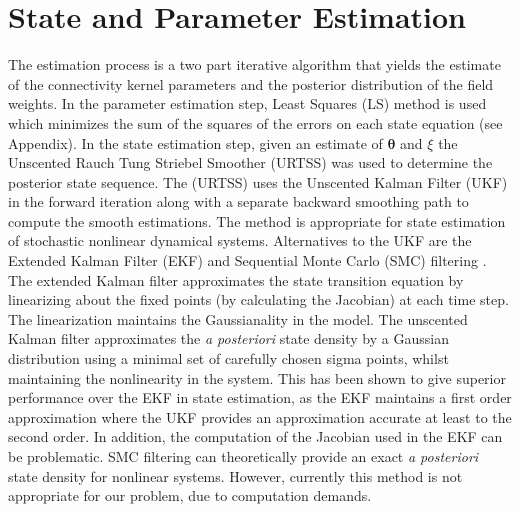 \documentclass[12pt]{iopart}		%
\begin{document}
\section{State and Parameter Estimation}
The estimation process is a two part iterative algorithm that yields the estimate of the connectivity kernel parameters and the posterior distribution of the field weights. In the parameter estimation step, Least Squares (LS) method is used which minimizes the sum of the squares of the errors on each state equation (see Appendix). In the state estimation step, given an estimate of $\boldsymbol \theta$ and $\xi$ the Unscented Rauch Tung Striebel Smoother (URTSS) \cite{Sarkka2010} was used to determine the posterior state sequence.
The (URTSS) uses the Unscented Kalman Filter (UKF) in the forward iteration \cite{Julier1997} along with a separate backward smoothing path to compute the smooth estimations. The method is appropriate for state estimation of stochastic nonlinear dynamical systems. Alternatives to the UKF are the Extended Kalman Filter (EKF) \cite{Haykin2001}  and Sequential Monte Carlo (SMC) filtering \cite{doucet2001}. The extended Kalman filter approximates the state transition equation by linearizing about the fixed points (by calculating the Jacobian) at each time step. The linearization maintains the Gaussianality in the model. The unscented Kalman filter approximates the \emph{a posteriori} state density by a Gaussian distribution using a minimal set of carefully chosen sigma points, whilst maintaining the nonlinearity in the system. This has been shown to give superior performance over the EKF in state estimation, as the EKF maintains a first order approximation where the UKF provides an approximation accurate at least to the second order. In addition, the computation of the Jacobian used in the
EKF can be problematic. SMC filtering can theoretically provide an exact \emph{a posteriori} state density for nonlinear systems. However, currently this method is not appropriate for our problem, due to computation demands.
\end{document}
